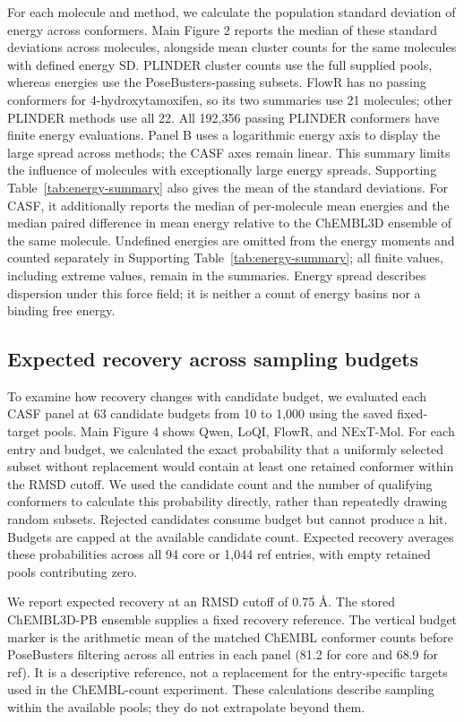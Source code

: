 For each molecule and method, we calculate the population standard deviation of energy
across conformers. Main Figure 2 reports the median of these standard
deviations across molecules, alongside mean cluster counts for the same molecules
with defined energy SD. PLINDER cluster counts use the full supplied pools, whereas
energies use the PoseBusters-passing subsets. FlowR has no passing conformers for
4-hydroxytamoxifen, so its two summaries use 21 molecules; other PLINDER methods use
all 22. All 192,356 passing PLINDER conformers have finite energy evaluations.
Panel B uses a logarithmic energy axis to display the large spread across methods;
the CASF axes remain linear.
This summary limits the influence of molecules with exceptionally large energy spreads.
Supporting Table~\ref{tab:energy-summary} also gives the mean of the standard deviations.
For CASF, it additionally reports the median of per-molecule mean energies and the
median paired difference in mean energy relative to the ChEMBL3D ensemble of the same molecule. Undefined energies are omitted from the energy moments and counted separately in Supporting
Table~\ref{tab:energy-summary}; all finite values, including extreme values, remain in the summaries.
Energy spread describes dispersion under this force field; it is neither a count of energy
basins nor a binding free energy.

\subsection*{Expected recovery across sampling budgets}

To examine how recovery changes with candidate budget, we evaluated each CASF panel at 63
candidate budgets from 10 to 1,000 using the saved fixed-target pools.
Main Figure 4 shows Qwen, LoQI, FlowR, and NExT-Mol. For each entry and budget,
we calculated the exact probability that a uniformly selected subset without replacement would
contain at least one retained conformer within the RMSD cutoff. We used the candidate count and the
number of qualifying conformers to calculate this probability directly, rather than repeatedly
drawing random subsets. Rejected candidates consume budget but cannot produce a hit. Budgets are
capped at the available candidate count. Expected recovery averages these probabilities across
all 94 core or 1,044 ref entries, with empty retained pools contributing zero.

We report expected recovery at an RMSD cutoff of 0.75 \AA{}. The stored
ChEMBL3D-PB ensemble supplies a fixed recovery reference. The vertical budget marker
is the arithmetic mean of the matched ChEMBL conformer counts before PoseBusters
filtering across all entries in each panel (81.2 for core and 68.9 for ref).
It is a descriptive reference, not a replacement for the entry-specific targets
used in the ChEMBL-count experiment. These calculations describe sampling within
the available pools; they do not extrapolate beyond them.

